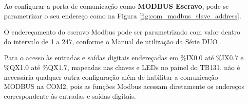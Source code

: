 \begin{figure}[ht!]
	\centering
\end{figure}


Ao configurar a porta de comunicação como \textbf{MODBUS Escravo}, pode-se parametrizar o seu endereço como na Figura \ref{fig:com_modbus_slave_address}.

\begin{figure}[ht!]
	\centering
\end{figure}


O endereçamento do escravo Modbus pode ser parametrizado com valor dentro do intervalo de 1 a 247, conforme o Manual de utilização da Série DUO \cite{manual_tb131}.


Para o acesso às entradas e saídas digitais endereçadas em \%IX0.0 até \%IX0.7 e \%QX1.0 até \%QX1.7, mapeadas nas chaves e LEDs no painel do TB131, não é necessária qualquer outra configuração além de habilitar a comunicação MODBUS na COM2, pois as funções Modbus acessam diretamente os endereços correspondente às entradas e saídas digitais. 

